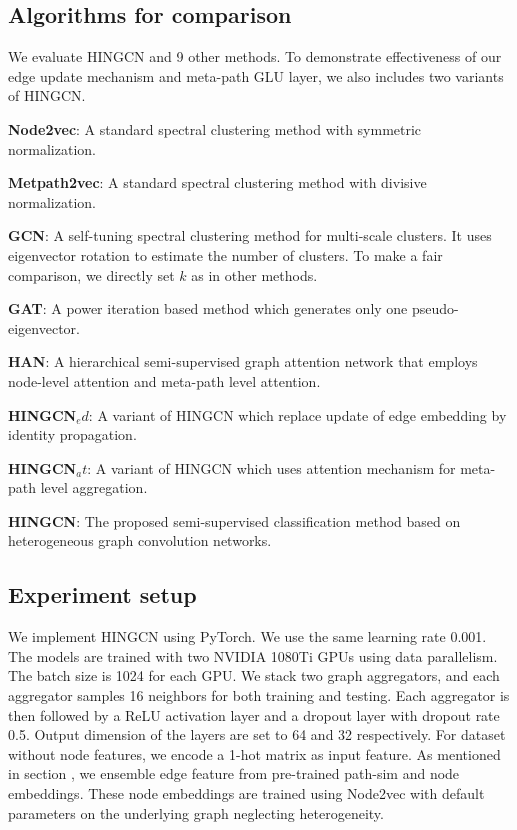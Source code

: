 \subsection{Algorithms for comparison}
\label{sec:algo-comp}
We evaluate HINGCN and 9 other methods. To demonstrate effectiveness of our edge update mechanism and meta-path GLU layer, we also includes two variants of HINGCN.

\noindent{\small$\bullet$}
\textbf{Node2vec}: A standard spectral clustering method with symmetric normalization.

\noindent{\small$\bullet$}
\textbf{Metpath2vec}: A standard spectral clustering method with divisive normalization.

\noindent{\small$\bullet$}
\textbf{GCN}: A self-tuning spectral clustering method for multi-scale clusters.
It uses eigenvector rotation to estimate the number of clusters.
To make a fair comparison, we directly set $k$ as in other methods.

\noindent{\small$\bullet$}
\textbf{GAT}: A power iteration based method which generates only one pseudo-eigenvector.

\noindent{\small$\bullet$}
\textbf{HAN}:
A hierarchical semi-supervised graph attention network that employs node-level attention and meta-path level attention.

\noindent{\small$\bullet$}
\textbf{HINGCN$_ed$}: 
A variant of HINGCN which replace update of edge embedding by identity propagation.

\noindent{\small$\bullet$}
\textbf{HINGCN$_at$}:
A variant of HINGCN which uses attention mechanism for meta-path level aggregation.

\noindent{\small$\bullet$}
\textbf{HINGCN}:
The proposed semi-supervised classification method based on heterogeneous graph convolution networks.


\subsection{Experiment setup}
\label{sec:setup}
We implement HINGCN using PyTorch. We use the same learning rate 0.001. The models  are trained with two NVIDIA 1080Ti GPUs using data parallelism. The batch size is 1024 for each GPU. We stack two graph aggregators, and each aggregator samples 16 neighbors for both training and testing. Each aggregator is then followed by a ReLU activation layer and a dropout layer with dropout rate 0.5. Output dimension of the layers are set to 64 and 32 respectively. For dataset without node features, we encode a 1-hot matrix as input feature. As mentioned in section , we ensemble edge feature from pre-trained path-sim and node embeddings. These node embeddings are trained using Node2vec with default parameters on the underlying graph neglecting heterogeneity.

